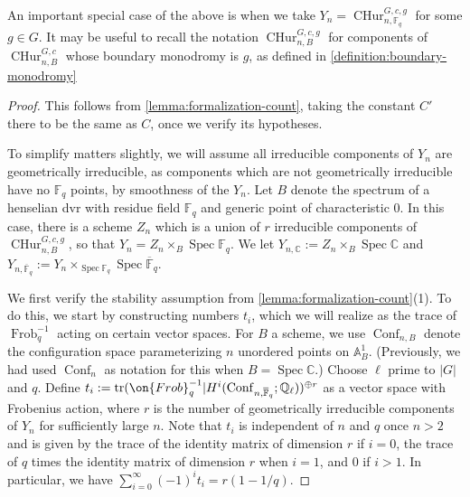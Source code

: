 \documentclass[12 pt]{amsart}
\theoremstyle{plain}
\theoremstyle{definition}
\theoremstyle{remark}
\numberwithin{equation}{section}
\DeclareMathOperator\spec{Spec}
\DeclareMathOperator\tr{tr}
\DeclareMathOperator\frob{Frob}
\DeclareMathOperator\conf{Conf}
\newcommand{\cphur}[4]{\operatorname{CHur}^{#1, #3}_{#2, #4}}
\newcommand{\boundarycphur}[5]{\operatorname{CHur}^{#1, #3, #5}_{#2, #4}}
\begin{document}
An important special case of the above is when we take 
$Y_n =\boundarycphur G n c {\mathbb F_q} g$ for some $g \in G$.
It may be useful to recall
the notation 
$\boundarycphur G n c B g$ for components of 
$\cphur G n c B$ whose boundary monodromy is $g$, as defined in
\autoref{definition:boundary-monodromy}

\begin{proof}
	This follows from \autoref{lemma:formalization-count}, taking the
	constant $C'$ there to be the same as $C$, once
	we verify its hypotheses.

	To simplify matters slightly, we will assume all irreducible components of $Y_n$
	are geometrically irreducible, as components which are not geometrically
	irreducible have no $\mathbb F_q$ points, by smoothness of the $Y_n$.
	Let $B$ denote the spectrum of a henselian dvr with residue field
	$\mathbb F_q$ and generic point of characteristic $0$. 
	In this case, there is a scheme $Z_n$ which is a union of $r$
	irreducible components of $\boundarycphur G n c B g$, so that $Y_n = Z_n
	\times_{B} \spec \mathbb F_q$.
	We let $Y_{n, \mathbb C} := Z_n \times_B \spec \mathbb C$ and
	$Y_{n, \overline{\mathbb F}_q} := Y_n \times_{\spec \mathbb F_q} \spec
 \overline{\mathbb F}_q.$

	We first verify the stability assumption from
	\autoref{lemma:formalization-count}(1).
	To do this, we start by constructing numbers $t_i$, which we will
	realize as the trace of $\frob_q^{-1}$ acting on certain vector spaces.
	For $B$ a scheme, we use $\conf_{n, B}$ denote the configuration space
	parameterizing $n$ unordered points on $\mathbb A^1_{B}$. (Previously,
	we had used $\conf_n$ as notation for this when $B = \spec \mathbb C$.)
	Choose $\ell$ prime to $|G|$ and $q$.
	Define $t_i := \tr(\on{Frob}_q^{-1}| H^i(\conf_{n,\overline{\mathbb F}_q};\mathbb
	Q_\ell))^{\oplus r}$ as a
	vector space with Frobenius action,
	where $r$ is the number of geometrically irreducible components of $Y_n$
for sufficiently
	large $n$.
	Note that $t_i$ is independent of $n$ and $q$ once $n > 2$ 
	and is given by the trace of the identity matrix of
	dimension $r$ if $i = 0$, the trace of $q$ times the identity matrix of dimension $r$
	when $i = 1$, and $0$ if $i > 1$.
	In particular, we have
	$\sum_{i=0}^\infty (-1)^i t_i
	= r(1 - 1/q)$.



\end{proof}
\end{document}
